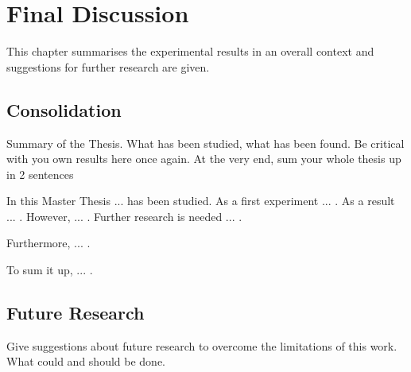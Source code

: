 \chapter{Final Discussion}
\label{c:final_discussion}

This chapter summarises the experimental results in an overall context and suggestions for further research are given.

\section{Consolidation}
\label{s:consolidation}

Summary of the Thesis. What has been studied, what has been found. Be critical with you own results here once again. At the very end, sum your whole thesis up in 2 sentences


In this Master Thesis ... has been studied. As a first experiment ... . As a result ... . However, ... . Further research is needed ... .

Furthermore, ... . 

To sum it up, ... .


\section{Future Research}
\label{s:futureresearch}

Give suggestions about future research to overcome the limitations of this work. What could and should be done.
















